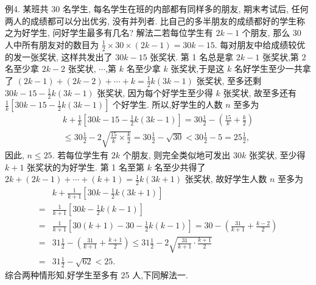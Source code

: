 例4. 某班共 30 名学生, 每名学生在班的内部都有同样多的朋友, 期末考试后, 任何两人的成绩都可以分出优劣, 没有并列者.
比自己的多半朋友的成绩都好的学生称之为好学生, 问好学生最多有几名?
解法二若每位学生有 $2 k-1$ 个朋友, 那么 30 人中所有朋友对的数目为 $\frac{1}{2} \times 30 \times(2 k-1)=30 k-15$. 每对朋友中给成绩较优的发一张奖状, 这样共发出了 $30 k-15$ 张奖状.
第 1 名总是拿 $2 k-1$ 张奖状,第 2 名至少拿 $2 k-2$ 张奖状, $\cdots$,第 $k$ 名至少拿 $k$ 张奖状,于是这 $k$ 名好学生至少一共拿了 $(2 k-1)+(2 k- 2)+\cdots+k=\frac{1}{2} k(3 k-1)$ 张奖状, 至多还剩 $30 k-15-\frac{1}{2} k(3 k-1)$ 张奖状, 因为每个好学生至少得 $k$ 张奖状, 故至多还有 $\frac{1}{k}\left[30 k-15-\frac{1}{2} k(3 k-1)\right]$ 个好学生.
所以,好学生的人数 $n$ 至多为
$$
\begin{gathered}
k+\frac{1}{k}\left[30 k-15-\frac{1}{2} k(3 k-1)\right]=30 \frac{1}{2}-\left(\frac{15}{k}+\frac{k}{2}\right) \\
\leqslant 30 \frac{1}{2}-2 \sqrt{\frac{15}{k} \times \frac{k}{2}}=30 \frac{1}{2}-\sqrt{30}<30 \frac{1}{2}-5=25 \frac{1}{2},
\end{gathered}
$$
因此, $n \leqslant 25$.
若每位学生有 $2 k$ 个朋友, 则完全类似地可发出 $30 k$ 张奖状, 至少得 $k+1$ 张奖状的为好学生.
第 1 名至第 $k$ 名至少共得了 $2 k+(2 k-1)+\cdots+(k+ 1)=\frac{1}{2} k(3 k+1)$ 张奖状, 故好学生人数 $n$ 至多为
$$
\begin{aligned}
& k+\frac{1}{k+1}\left[30 k-\frac{1}{2} k(3 k+1)\right] \\
= & \frac{1}{k+1}\left[30 k-\frac{1}{2} k(k-1)\right] \\
= & \frac{1}{k+1}\left[30(k+1)-30-\frac{1}{2} k(k-1)\right]=30-\left(\frac{31}{k+1}+\frac{k-2}{2}\right) \\
= & 31 \frac{1}{2}-\left(\frac{31}{k+1}+\frac{k+1}{2}\right) \leqslant 31 \frac{1}{2}-2 \sqrt{\frac{31}{k+1} \cdot \frac{k+1}{2}} \\
= & 31 \frac{1}{2}-\sqrt{62}<25 .
\end{aligned}
$$
综合两种情形知,好学生至多有 25 人,下同解法一.



